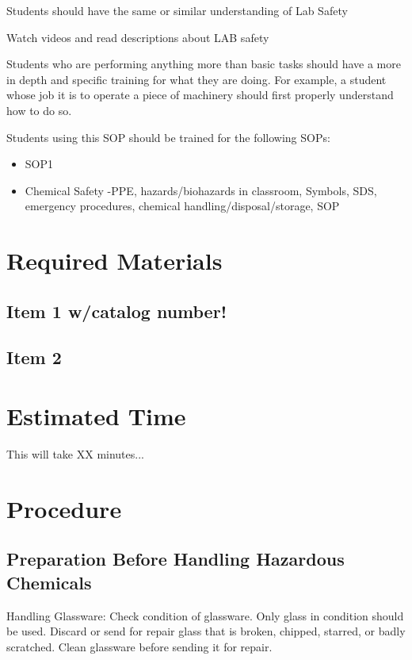 \documentclass[12pt]{../SOP2}
\begin{document}
Students should have the same or similar understanding of Lab Safety

Watch videos and read descriptions about LAB safety

Students who are performing anything more than basic tasks should have a more in depth and specific training for what they are doing. For example, a student whose job it is to operate a piece of machinery should first properly understand how to do so.

Students using this SOP should be trained for the following SOPs:

\begin{itemize}
  \item SOP1
  \item Chemical Safety
-PPE, hazards/biohazards in classroom, Symbols, SDS, emergency procedures, chemical handling/disposal/storage, SOP
\end{itemize}


\section{Required Materials}

\subsection{Item 1 w/catalog number!}
\subsection{Item 2}

\section{Estimated Time}

\NP This will take XX minutes...

\section{Procedure}

\subsection{Preparation Before Handling Hazardous Chemicals}


\NP Handling Glassware: Check condition of glassware. Only glass in condition should be used. Discard or send for repair glass that is broken, chipped, starred, or badly scratched. Clean glassware before sending it for repair. 
\end{document}
